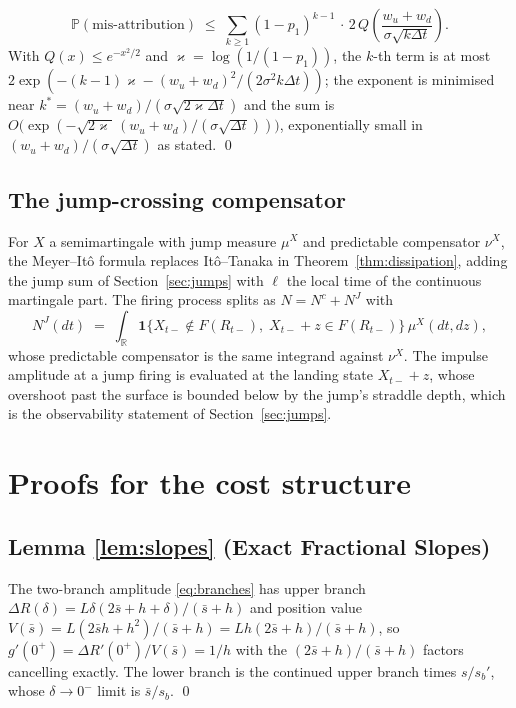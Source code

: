 \documentclass[11pt,a4paper]{article}
\theoremstyle{definition}
\theoremstyle{plain}
\theoremstyle{remark}
\newcommand{\surv}{Q}
\begin{document}
\[
\mathbb{P}(\text{mis-attribution}) \;\le\; \sum_{k \ge 1} (1 - p_1)^{k-1}\, \cdot\, 2\, \surv\left( \frac{w_u + w_d}{\sigma\sqrt{k \Delta t}} \right).
\]
With $\surv(x) \le e^{-x^2/2}$ and $\varkappa = \log(1/(1-p_1))$, the $k$-th term is at most $2 \exp(-(k-1)\varkappa - (w_u + w_d)^2/(2\sigma^2 k \Delta t))$; the exponent is 
minimised near $k^* = (w_u + w_d)/(\sigma\sqrt{2\varkappa \Delta t})$ and the sum is $O\big(\exp(-\sqrt{2\varkappa}\, (w_u + w_d) / (\sigma \sqrt{\Delta
t}))\big)$, exponentially 
small in $(w_u + w_d)/(\sigma\sqrt{\Delta t})$ as stated. \qed

\subsection{The jump-crossing compensator}

For $X$ a semimartingale with jump measure $\mu^X$ and predictable compensator $\nu^X$, the Meyer--It\^o formula\cite{protter2005} replaces It\^o--Tanaka in Theorem~\ref{thm:dissipation}, 
adding the jump sum of Section~\ref{sec:jumps} with $\ell$ the local time of the continuous martingale part. The firing process splits as $N = N^{c} + N^{J}$ with
\[
N^{J}(dt) \;=\; \int_{\mathbb{R}} \mathbf{1}\big\{
X_{t-} \notin F(R_{t-}),\; X_{t-} + z \in F(R_{t-}) \big\}\,
\mu^X(dt, dz),
\]
whose predictable compensator is the same integrand against $\nu^X$. The impulse amplitude at a jump firing is evaluated at the landing state $X_{t-} + z$, whose overshoot 
past the surface is bounded below by the jump's straddle depth, which is the observability statement of Section~\ref{sec:jumps}.


\section{Proofs for the cost structure}\label{app:cost}

\subsection{Lemma \ref{lem:slopes} (Exact Fractional Slopes)}

The two-branch amplitude \eqref{eq:branches} has upper branch
$\Delta R(\delta) = L\delta(2\bar s + h + \delta)/(\bar s + h)$ and position value $V(\bar s) = L(2\bar s h + h^2)/(\bar s + h) =
Lh(2\bar s + h)/(\bar s + h)$, so $g'(0^+) = \Delta R'(0^+)/V(\bar
s) = 1/h$ with the $(2\bar s + h)/(\bar s + h)$ factors cancelling exactly. The lower branch is the continued upper branch times
$s/s_b'$, whose $\delta \to 0^-$ limit is $\bar s/s_b$. \qed
\end{document}
